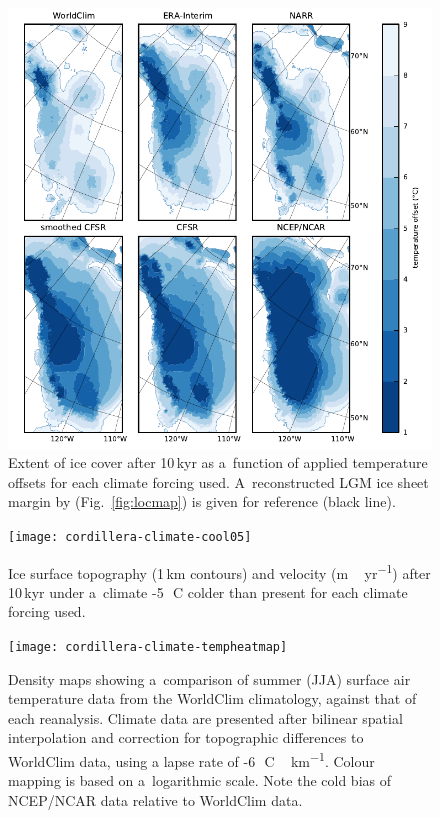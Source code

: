 \documentclass[tc, ms]{copernicus}
\begin{document}
\begin{figure}
  \includegraphics{cordillera-climate-extent}
  \caption{Extent of ice cover after 10\,kyr as a~function of applied temperature offsets for each climate forcing used. A~reconstructed LGM ice sheet margin by \citet{dyke-2004} (Fig.~\ref{fig:locmap}) is given for reference (black line).}
  \label{fig:extent}
\end{figure}

\begin{figure}
  \texttt{[image: cordillera-climate-cool05]}
  \caption{Ice surface topography (1\,\unit{km} contours) and velocity (\unit{m\,yr^{-1}}) after 10\,kyr under a~climate -5\,\unit{{\degree}C} colder than present for each climate forcing used.}
  \label{fig:cool05}
\end{figure}

\begin{figure}
  \texttt{[image: cordillera-climate-tempheatmap]}
  \caption{Density maps showing a~comparison of summer (JJA) surface air temperature data from the WorldClim climatology, against that of each reanalysis. Climate data are presented after bilinear spatial interpolation and correction for topographic differences to WorldClim data, using a lapse rate of -6\,\unit{{\degree}C\,km^{-1}}. Colour mapping is based on a~logarithmic scale. Note the cold bias of NCEP/NCAR data relative to WorldClim data.}
  \label{fig:tempheatmap}
\end{figure}
\end{document}

